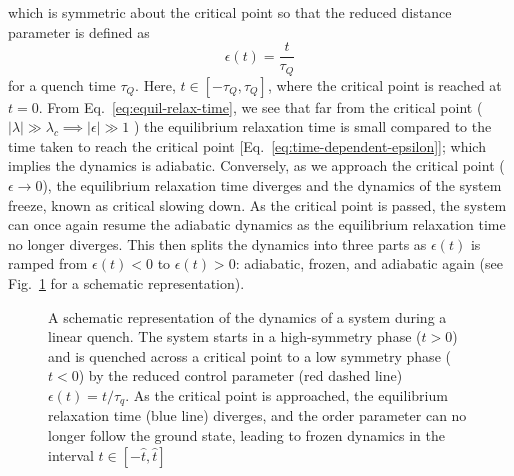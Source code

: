 which is symmetric about the critical point so that the reduced distance
parameter is defined as
\begin{equation}
    \epsilon(t) = \frac{t}{\tau_Q}
    \label{eq:time-dependent-epsilon}
\end{equation}
for a quench time $\tau_Q$.
Here, $t \in [-\tau_Q, \tau_Q]$, where the critical point is reached at $t=0$.
From Eq.~\eqref{eq:equil-relax-time}, we see that far from the critical point
($|\lambda| \gg \lambda_c \implies |\epsilon| \gg 1$ ) the equilibrium
relaxation time is small compared to the time taken to reach the critical point
[Eq.~\eqref{eq:time-dependent-epsilon}]; which implies the dynamics is
adiabatic.
Conversely, as we approach the critical point ($\epsilon \rightarrow 0$), the
equilibrium relaxation time diverges and the dynamics of the system freeze,
known as critical slowing down.
As the critical point is passed, the system can once again resume the adiabatic
dynamics as the equilibrium relaxation time no longer diverges.
This then splits the dynamics into three parts as $\epsilon(t)$ is ramped from
$\epsilon(t) < 0 $ to $\epsilon(t) > 0$: adiabatic, frozen, and adiabatic again
(see Fig.~\ref{fig:adiabatic-impulse} for a schematic representation).
\begin{figure}
    \centering
    \caption{A schematic representation of the dynamics of a system during a
    linear quench. The system starts in a high-symmetry phase ($t>0$) and is
    quenched across a critical point to a low symmetry phase ($t < 0$) by the
    reduced control parameter (red dashed line) $\epsilon(t)=t/\tau_q$. As
    the critical point is approached, the equilibrium relaxation time
    (blue line) diverges, and the order parameter can no longer follow the 
    ground state, leading to frozen dynamics in the interval
    $t \in [-\hat{t}, \hat{t}]$}
    \label{fig:adiabatic-impulse}
\end{figure}

